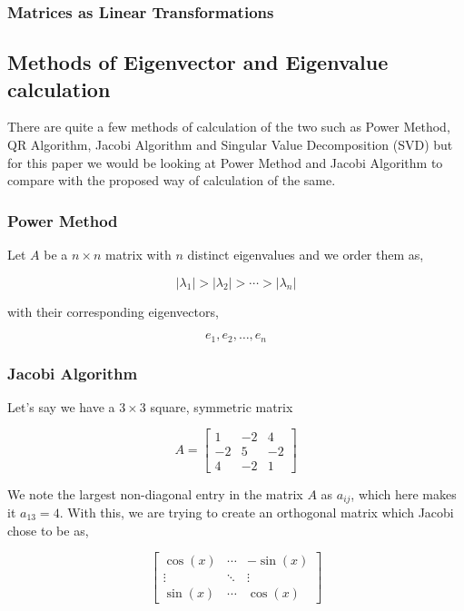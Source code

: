 \documentclass{article}
\begin{document}
\subsubsection{Matrices as Linear Transformations}


\subsection{Methods of Eigenvector and Eigenvalue calculation}

There are quite a few methods of calculation of the two such as Power Method, QR Algorithm, Jacobi Algorithm and Singular Value Decomposition (SVD) but for this paper we would be looking at Power Method and Jacobi Algorithm to compare with the proposed way of calculation of the same.

\subsubsection{Power Method}

Let $A$ be a $n \times n$ matrix with $n$ distinct eigenvalues and we order them as,

\[
    |\lambda_{1}| > |\lambda_{2}| > \cdots > |\lambda_{n}| 
\]

with their corresponding eigenvectors,

\[
    e_{1}, e_{2}, \dots, e_{n}
\]  

\subsubsection{Jacobi Algorithm}

Let's say we have a $3 \times 3$ square, symmetric matrix

\[
    A = 
    \begin{bmatrix}
        1 & -2 & 4 \\
        -2 & 5 & -2 \\
        4 & -2 & 1
    \end{bmatrix}  
\]

We note the largest non-diagonal entry in the matrix $A$ as $a_{ij}$, which here makes it $a_{13} = 4$. With this, we are trying to create an orthogonal matrix which Jacobi chose to be as,

\[
    \begin{bmatrix}
        \cos(x) & \cdots & -\sin(x) \\
        \vdots & \ddots & \vdots \\
        \sin(x) & \cdots & \cos(x)    
    \end{bmatrix}
\]
\end{document}
